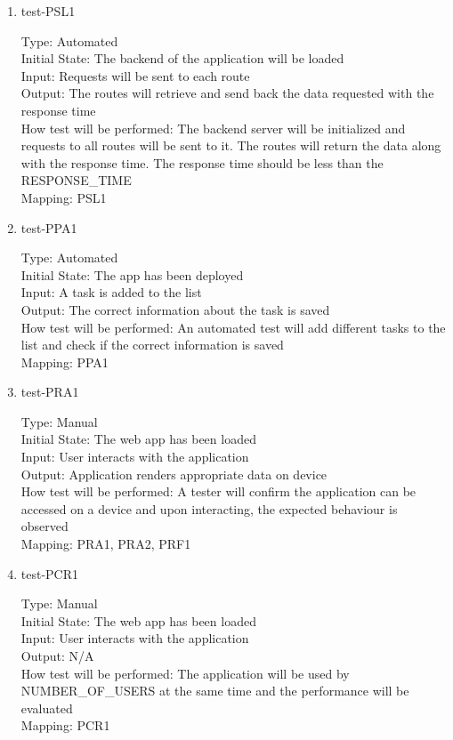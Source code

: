 \documentclass[12pt, titlepage]{article}
\begin{document}
\begin{enumerate}
\item{test-PSL1\\}

Type: Automated\\
Initial State: The backend of the application will be loaded\\
Input: Requests will be sent to each route\\
Output: The routes will retrieve and send back the data requested with the response time\\
How test will be performed: The backend server will be initialized and requests to all routes will be sent to it. The routes will return the data along with the response time. The response time should be less than the RESPONSE\_TIME\\
Mapping: PSL1

\item{test-PPA1\\}

Type: Automated\\
Initial State: The app has been deployed\\
Input: A task is added to the list\\
Output: The correct information about the task is saved\\
How test will be performed: An automated test will add different tasks to the list and check if the correct information is saved\\
Mapping: PPA1\\

\item{test-PRA1\\}

Type: Manual\\
Initial State: The web app has been loaded\\
Input: User interacts with the application\\
Output: Application renders appropriate data on device\\
How test will be performed: A tester will confirm the application can be accessed on a device and upon interacting, the expected behaviour is observed\\
Mapping: PRA1, PRA2, PRF1\\

\item{test-PCR1\\}

Type: Manual\\
Initial State: The web app has been loaded\\
Input: User interacts with the application\\
Output: N/A\\
How test will be performed: The application will be used by NUMBER\_OF\_USERS at the same time and the performance will be evaluated\\
Mapping: PCR1\\
\end{enumerate}
\end{document}
